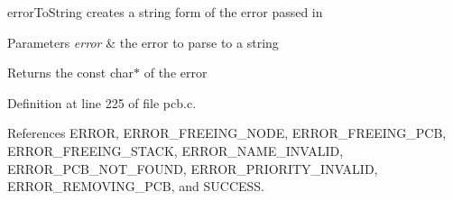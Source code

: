 error\+To\+String creates a string form of the error passed in 


\begin{DoxyParams}{Parameters}
{\em error} & the error to parse to a string \\
\hline
\end{DoxyParams}
\begin{DoxyReturn}{Returns}
the const char$\ast$ of the error 
\end{DoxyReturn}


Definition at line 225 of file pcb.\+c.



References E\+R\+R\+OR, E\+R\+R\+O\+R\+\_\+\+F\+R\+E\+E\+I\+N\+G\+\_\+\+N\+O\+DE, E\+R\+R\+O\+R\+\_\+\+F\+R\+E\+E\+I\+N\+G\+\_\+\+P\+CB, E\+R\+R\+O\+R\+\_\+\+F\+R\+E\+E\+I\+N\+G\+\_\+\+S\+T\+A\+CK, E\+R\+R\+O\+R\+\_\+\+N\+A\+M\+E\+\_\+\+I\+N\+V\+A\+L\+ID, E\+R\+R\+O\+R\+\_\+\+P\+C\+B\+\_\+\+N\+O\+T\+\_\+\+F\+O\+U\+ND, E\+R\+R\+O\+R\+\_\+\+P\+R\+I\+O\+R\+I\+T\+Y\+\_\+\+I\+N\+V\+A\+L\+ID, E\+R\+R\+O\+R\+\_\+\+R\+E\+M\+O\+V\+I\+N\+G\+\_\+\+P\+CB, and S\+U\+C\+C\+E\+SS.



